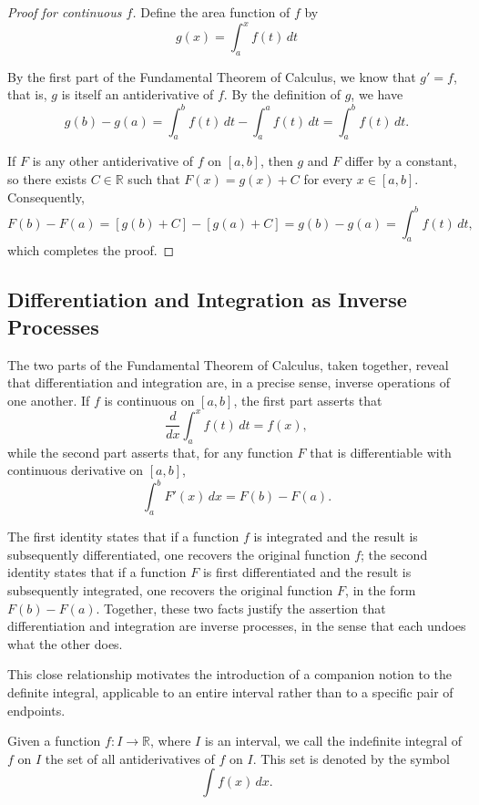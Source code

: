 \begin{proof}[Proof for continuous $f$]
Define the area function of $f$ by
\[
g(x) = \int_a^x f(t) \, dt
\]

By the first part of the Fundamental Theorem of Calculus, we know that $g' = f$, that is, $g$ is itself an antiderivative of $f$. By the definition of $g$, we have
\[
g(b) - g(a) = \int_a^b f(t) \, dt - \int_a^a f(t) \, dt = \int_a^b f(t) \, dt.
\]

If $F$ is any other antiderivative of $f$ on $[a,b]$, then $g$ and $F$ differ by a constant, so there exists $C \in \mathbb{R}$ such that $F(x) = g(x) + C$ for every $x \in [a,b]$. Consequently,
\[
F(b) - F(a) = [g(b) + C] - [g(a) + C] = g(b) - g(a) = \int_a^b f(t) \, dt,
\]
which completes the proof.
\end{proof}

\subsection{Differentiation and Integration as Inverse Processes}

The two parts of the Fundamental Theorem of Calculus, taken together, reveal that differentiation and integration are, in a precise sense, inverse operations of one another. If $f$ is continuous on $[a,b]$, the first part asserts that \[
\frac{d}{dx} \int_a^x f(t) \, dt = f(x),
\] while the second part asserts that, for any function $F$ that is differentiable with continuous derivative on $[a,b]$,
\[
\int_a^b F'(x) \, dx = F(b) - F(a).
\]

The first identity states that if a function $f$ is integrated and the result is subsequently differentiated, one recovers the original function $f$; the second identity states that if a function $F$ is first differentiated and the result is subsequently integrated, one recovers the original function $F$, in the form $F(b) - F(a)$. Together, these two facts justify the assertion that differentiation and integration are inverse processes, in the sense that each undoes what the other does.

This close relationship motivates the introduction of a companion notion to the definite integral, applicable to an entire interval rather than to a specific pair of endpoints.

\begin{definition}
Given a function $f : I \to \mathbb{R}$, where $I$ is an interval, we call the indefinite integral of $f$ on $I$ the set of all antiderivatives of $f$ on $I$. This set is denoted by the symbol
\[
\int f(x) \, dx.
\]

\end{definition}

